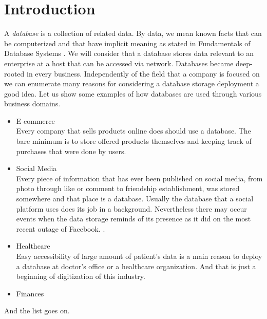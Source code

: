 \chapter{Introduction}

\par 
A \textit{database} is a collection of related data. By data, we mean known facts that can be computerized and that have implicit meaning as stated in Fundamentals of Database Systems \cite{ElmasryNavathe15}. We will consider that a database stores data relevant to an enterprise at a host that can be accessed via network.
Databases became deep-rooted in every business. 
Independently of the field that a company is focused on we can enumerate many reasons for considering a database storage deployment a good idea.
Let us show some examples of how databases are used through various business domains.

\begin{itemize}
	\item E-commerce \\
	Every company that sells products online does should use a database. The bare minimum is to store offered products themselves and keeping track of purchases that were done by users.
	
	\item Social Media \\
	Every piece of information that has ever been published on social media, from photo through like or comment to friendship establishment, was stored somewhere and that place is a database. Usually the database that a social platform uses does its job in a background. Nevertheless there may occur events when the data storage reminds of its presence as it did on the most recent outage of Facebook. \cite{Facebook19}.
	
	\item Healthcare \\
	Easy accessibility of large amount of patient's data is a main reason to deploy a database at doctor's office or a healthcare organization.
	And that is just a beginning of digitization of this industry.
	
	\item Finances \\
	
	
\end{itemize}
And the list goes on.
 \\


